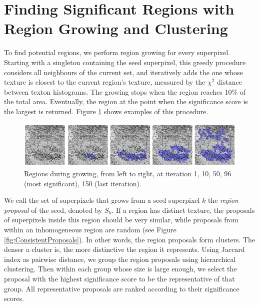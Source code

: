 \documentclass{llncs}
\begin{document}
\section{Finding Significant Regions with Region Growing and Clustering}

To find potential regions, we perform region growing for every superpixel. Starting with a singleton containing the seed superpixel, this greedy procedure considers all neighbours of the current set, and iteratively adds the one whose texture is closest to the current region's texture, measured by the $\chi^2$ distance between texton histograms. The growing stops when the region reaches 10\% of the total area. Eventually, the region at the point when the significance score is the largest is returned. Figure \ref{fig:RegionGrowing} shows examples of this procedure.
\begin{figure}
	\includegraphics[width=\textwidth]{../figures/RegionGrowingPicsOnly.png}
	\caption{Regions during growing, from left to right, at iteration 1, 10, 50, 96 (most significant), 150 (last iteration).} %
	\label{fig:RegionGrowing}
\end{figure}


We call the set of superpixels that grows from a seed superpixel $k$ the \textit{region proposal} of the seed, denoted by $S_k$. If a region has distinct texture, the proposals of superpixels inside this region should be very similar, while proposals from within an inhomogeneous region are random (see Figure \ref{fig:ConsistentProposals}). In other words, the region proposals form clusters. The denser a cluster is, the more distinctive the region it represents. Using Jaccard index as pairwise distance, we group the region proposals using hierarchical clustering. Then within each group whose size is large enough, we select the proposal with the highest significance score to be the representative of that group. All representative proposals are ranked according to their significance scores. 
\end{document}
